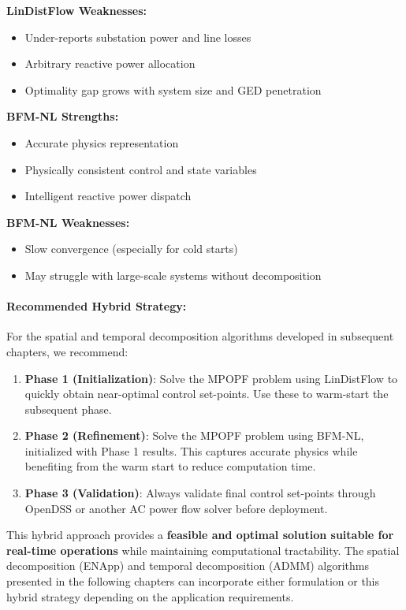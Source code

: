 \textbf{LinDistFlow Weaknesses:}
\begin{itemize}
    \item Under-reports substation power and line losses
    \item Arbitrary reactive power allocation
    \item Optimality gap grows with system size and GED penetration
\end{itemize}

\textbf{BFM-NL Strengths:}
\begin{itemize}
    \item Accurate physics representation
    \item Physically consistent control and state variables
    \item Intelligent reactive power dispatch
\end{itemize}

\textbf{BFM-NL Weaknesses:}
\begin{itemize}
    \item Slow convergence (especially for cold starts)
    \item May struggle with large-scale systems without decomposition
\end{itemize}

\paragraph{Recommended Hybrid Strategy:}

For the spatial and temporal decomposition algorithms developed in subsequent chapters, we recommend:

\begin{enumerate}
    \item \textbf{Phase 1 (Initialization)}: Solve the MPOPF problem using LinDistFlow to quickly obtain near-optimal control set-points. Use these to warm-start the subsequent phase.
    
    \item \textbf{Phase 2 (Refinement)}: Solve the MPOPF problem using BFM-NL, initialized with Phase 1 results. This captures accurate physics while benefiting from the warm start to reduce computation time.
    
    \item \textbf{Phase 3 (Validation)}: Always validate final control set-points through OpenDSS or another AC power flow solver before deployment.
\end{enumerate}

This hybrid approach provides a \textbf{feasible and optimal solution suitable for real-time operations} while maintaining computational tractability. The spatial decomposition (ENApp) and temporal decomposition (ADMM) algorithms presented in the following chapters can incorporate either formulation or this hybrid strategy depending on the application requirements.

